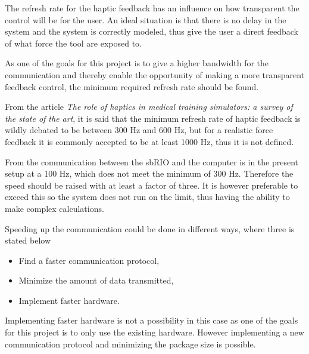 The refresh rate for the haptic feedback has an influence on how transparent the control will be for the user. An ideal situation is that there is no delay in the system and the system is correctly modeled, thus give the user a direct feedback of what force the tool are exposed to. 

As one of the goals for this project is to give a higher bandwidth for the communication and thereby enable the opportunity of making a more transparent feedback control, the minimum required refresh rate should be found.

From the article \textit{The role of haptics in medical training simulators: a survey of the state of the art}\cite{coles2011role}, it is said that the minimum refresh rate of haptic feedback is wildly debated to be between 300 Hz and 600 Hz, but for a realistic force feedback it is commonly accepted to be at least 1000 Hz, thus it is not defined. 

From   the communication between the sbRIO and the computer is in the present setup at a 100 Hz, which does not meet the minimum of 300 Hz. Therefore the speed should be raised with at least a factor of three. It is however preferable to exceed this so the system does not run on the limit, thus having the ability to make complex calculations.

Speeding up the communication could be done in different ways, where three is stated below

\begin{itemize}
	\item Find a faster communication protocol,
	\item Minimize the amount of data transmitted,
	\item Implement faster hardware.	
\end{itemize}

Implementing faster hardware is not a possibility in this case as one of the goals for this project is to only use the existing hardware.
However implementing a new communication protocol and minimizing the package size is possible.
